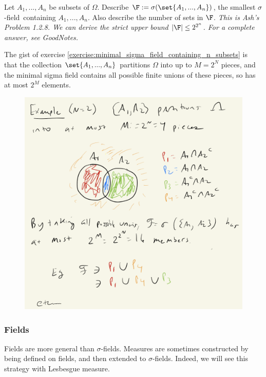 \documentclass{article} %
\renewcommand{\sf}{$\sigma$-field}
\newcommand{\sfs}{$\sigma$-fields}
\begin{document}
\begin{exercise}
\label{exercise:minimal_sigma_field_containing_n_subsets}
Let $A_1,...,A_n$ be subsets of $\Omega$.  Describe $\F := \sigma(\set{A_1,...,A_n})$, the smallest \sf\ containing $A_1,...,A_n$.  Also describe the number of sets in $\F$.   \textit{This is Ash's Problem 1.2.8.  We can derive the strict upper bound $|\F| \leq 2^{2^n}$. For a complete answer, see GoodNotes. }	
\end{exercise}

\begin{remark}
The gist of exercise \ref{exercise:minimal_sigma_field_containing_n_subsets} is that the collection $\set{A_1,...,A_n}$ partitions $\Omega$ into up to $M=2^N$ pieces, and the minimal sigma field contains all possible finite unions of these pieces, so has at most $2^{M}$ elements.
  
\begin{figure}[h!]
\centering 
\includegraphics[width=.7\textwidth]{images/minimal_sigma_fields}
\end{figure}

\end{remark}

\subsubsection{Fields}

Fields are more general than $\sigma$-fields.  Measures are sometimes constructed by being defined on fields, and then extended to \sfs.  Indeed, we will see this strategy with Lesbesgue measure. 
\end{document}

